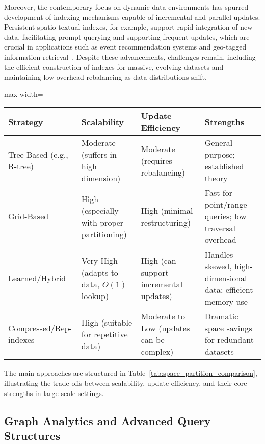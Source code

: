 \documentclass[sigconf]{acmart}
\begin{document}
Moreover, the contemporary focus on dynamic data environments has spurred development of indexing mechanisms capable of incremental and parallel updates. Persistent spatio-textual indexes, for example, support rapid integration of new data, facilitating prompt querying and supporting frequent updates, which are crucial in applications such as event recommendation systems and geo-tagged information retrieval~\cite{ref114,ref118}. Despite these advancements, challenges remain, including the efficient construction of indexes for massive, evolving datasets and maintaining low-overhead rebalancing as data distributions shift.

\begin{table*}[htbp]
\centering
\caption{Comparison of Space-Partitioning Index Strategies for Large-Scale Query Processing}
\label{tab:space_partition_comparison}
\begin{adjustbox}{max width=\textwidth}
\begin{tabular}{llll}
\toprule
\textbf{Strategy} & \textbf{Scalability} & \textbf{Update Efficiency} & \textbf{Strengths} \\
\midrule
Tree-Based (e.g., R-tree) & Moderate (suffers in high dimension) & Moderate (requires rebalancing) & General-purpose; established theory \\
Grid-Based & High (especially with proper partitioning) & High (minimal restructuring) & Fast for point/range queries; low traversal overhead \\
Learned/Hybrid & Very High (adapts to data, $O(1)$ lookup) & High (can support incremental updates) & Handles skewed, high-dimensional data; efficient memory use \\
Compressed/Rep-indexes & High (suitable for repetitive data) & Moderate to Low (updates can be complex) & Dramatic space savings for redundant datasets \\
\bottomrule
\end{tabular}
\end{adjustbox}
\end{table*}

The main approaches are structured in Table~\ref{tab:space_partition_comparison}, illustrating the trade-offs between scalability, update efficiency, and their core strengths in large-scale settings.

\subsection{Graph Analytics and Advanced Query Structures}
\end{document}
